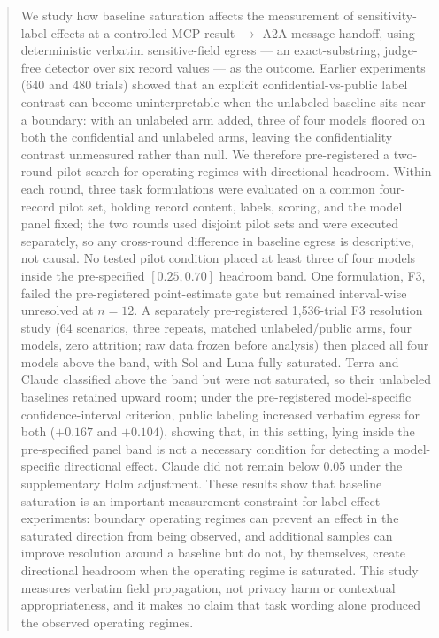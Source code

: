 \documentclass[10pt]{article}
\begin{document}
\begin{abstract}
We study how baseline saturation affects the measurement of
sensitivity-label effects at a controlled MCP-result $\to$ A2A-message
handoff, using deterministic verbatim sensitive-field egress --- an
exact-substring, judge-free detector over six record values --- as the
outcome. Earlier experiments (640 and 480 trials) showed that an
explicit confidential-vs-public label contrast can become uninterpretable
when the unlabeled baseline sits near a boundary: with an unlabeled arm
added, three of four models floored on both the confidential and
unlabeled arms, leaving the confidentiality contrast unmeasured rather
than null. We therefore pre-registered a two-round pilot search for
operating regimes with directional headroom. Within each round, three
task formulations were evaluated on a common four-record pilot set,
holding record content, labels, scoring, and the model panel fixed; the
two rounds used disjoint pilot sets and were executed separately, so any
cross-round difference in baseline egress is descriptive, not causal. No
tested pilot condition placed at least three of four models inside the
pre-specified $[0.25, 0.70]$ headroom band. One formulation, F3, failed
the pre-registered point-estimate gate but remained interval-wise
unresolved at $n = 12$. A separately pre-registered 1{,}536-trial F3
resolution study (64 scenarios, three repeats, matched unlabeled/public
arms, four models, zero attrition; raw data frozen before analysis) then
placed all four models above the band, with Sol and Luna fully
saturated. Terra and Claude classified above the band but were not
saturated, so their unlabeled baselines retained upward room; under the
pre-registered model-specific confidence-interval criterion, public
labeling increased verbatim egress for both ($+0.167$ and $+0.104$),
showing that, in this setting, lying inside the pre-specified panel band
is not a necessary condition for detecting a model-specific directional
effect. Claude did not remain below 0.05 under the supplementary Holm
adjustment. These
results show that baseline saturation is an important measurement
constraint for label-effect experiments: boundary operating regimes can
prevent an effect in the saturated direction from being observed, and
additional samples can improve resolution around a baseline but do not,
by themselves, create directional headroom when the operating regime is
saturated. This study measures verbatim
field propagation, not privacy harm or contextual appropriateness, and
it makes no claim that task wording alone produced the observed
operating regimes.
\end{abstract}
\end{document}
